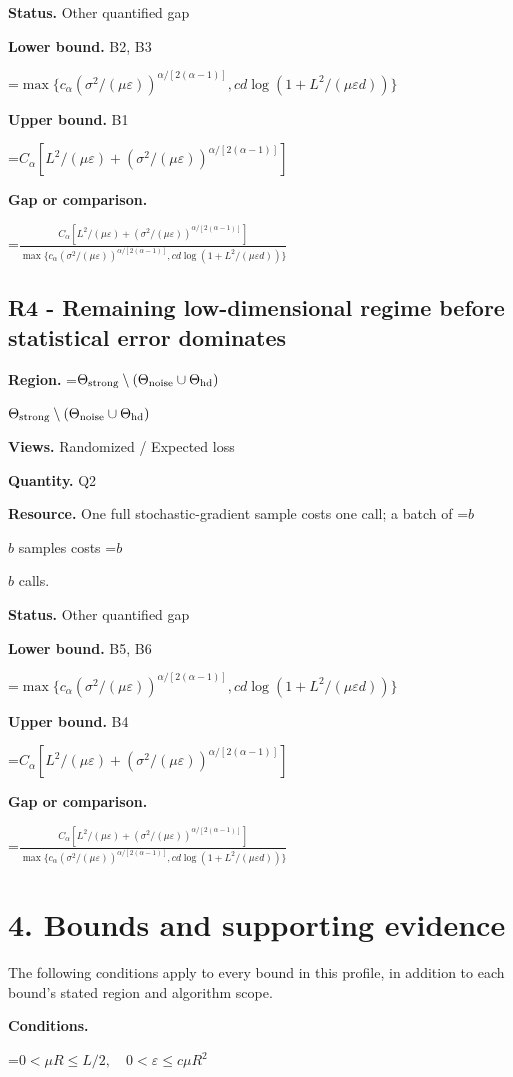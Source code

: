 \documentclass[10pt,a4paper]{article}
\newcommand{\AtlasMath}[1]{\par\begingroup\centering\setbox0=\hbox{$\displaystyle #1$}\ifdim\wd0>1.4\linewidth\typeout{ATLAS WIDE FORMULA: \the\wd0}\fi\ifdim\wd0>\linewidth\resizebox{\linewidth}{!}{\box0}\else\box0\fi\par\endgroup}
\newcommand{\AtlasInlineMath}[1]{\begingroup\setbox0=\hbox{$#1$}\ifdim\wd0>.4\linewidth\endgroup\AtlasMath{#1}\else\endgroup$#1$\fi}
\begin{document}
\textbf{Status.} Other quantified gap

\textbf{Lower bound.} B2, B3

\AtlasMath{\max\{c_\alpha (\sigma^2/(\mu\varepsilon))^{\alpha/[2(\alpha-1)]},c d\log(1+L^2/(\mu\varepsilon d))\}}
\textbf{Upper bound.} B1

\AtlasMath{C_\alpha[L^2/(\mu\varepsilon)+(\sigma^2/(\mu\varepsilon))^{\alpha/[2(\alpha-1)]}]}
\textbf{Gap or comparison.} 
\AtlasMath{\frac{C_\alpha[L^2/(\mu\varepsilon)+(\sigma^2/(\mu\varepsilon))^{\alpha/[2(\alpha-1)]}]}{\max\{c_\alpha (\sigma^2/(\mu\varepsilon))^{\alpha/[2(\alpha-1)]},c d\log(1+L^2/(\mu\varepsilon d))\}}}


\subsection{R4 - Remaining low-dimensional regime before statistical error dominates}
\textbf{Region.} \AtlasInlineMath{\Theta_{\rm strong}\setminus(\Theta_{\rm noise}\cup\Theta_{\rm hd})}

\textbf{Views.} Randomized / Expected loss

\textbf{Quantity.} Q2

\textbf{Resource.} One full stochastic-gradient sample costs one call; a batch of \AtlasInlineMath{b} samples costs \AtlasInlineMath{b} calls.

\textbf{Status.} Other quantified gap

\textbf{Lower bound.} B5, B6

\AtlasMath{\max\{c_\alpha (\sigma^2/(\mu\varepsilon))^{\alpha/[2(\alpha-1)]},c d\log(1+L^2/(\mu\varepsilon d))\}}
\textbf{Upper bound.} B4

\AtlasMath{C_\alpha[L^2/(\mu\varepsilon)+(\sigma^2/(\mu\varepsilon))^{\alpha/[2(\alpha-1)]}]}
\textbf{Gap or comparison.} 
\AtlasMath{\frac{C_\alpha[L^2/(\mu\varepsilon)+(\sigma^2/(\mu\varepsilon))^{\alpha/[2(\alpha-1)]}]}{\max\{c_\alpha (\sigma^2/(\mu\varepsilon))^{\alpha/[2(\alpha-1)]},c d\log(1+L^2/(\mu\varepsilon d))\}}}


\section{4. Bounds and supporting evidence}
The following conditions apply to every bound in this profile, in addition to each bound's stated region and algorithm scope.

\textbf{Conditions.} 
\AtlasMath{0<\mu R\le L/2,\quad0<\varepsilon\le c\mu R^2}
\end{document}

